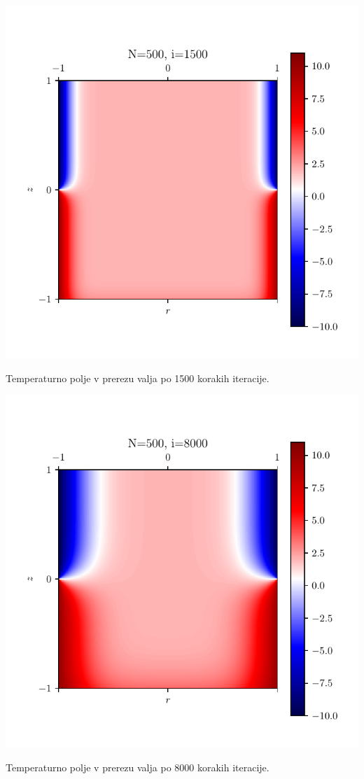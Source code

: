 \begin{center}
     \begin{minipage}{0.45\textwidth}
        \centering
    \includegraphics[width=\textwidth]{../old/2-valj-profili500_1500.pdf}
    \caption{Temperaturno polje v prerezu valja po 1500 korakih iteracije.}
    \end{minipage}\hfill
    \begin{minipage}{0.45\textwidth}
        \centering
    \includegraphics[width=\textwidth]{../old/2-valj-profili500_8000.pdf}
    \caption{Temperaturno polje v prerezu valja po 8000 korakih iteracije.}
    \end{minipage}
\end{center}
